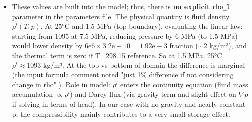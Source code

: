 \documentclass[10pt,a4paper]{article}
\begin{document}
\begin{itemize}
\begin{itemize}
        \item These values are built into the model; thus, there is \textbf{no explicit} \texttt{rho\_l} parameter in the parameters file. The physical quantity is fluid density $\rho^l(T,p)$. At 25°C and 1.5 MPa (top boundary), evaluating the linear law: starting from 1095 at 7.5 MPa, reducing pressure by 6 MPa (to 1.5 MPa) would lower density by $6\text{e}6 \times 3.2\text{e}-10 = 1.92\text{e}-3$ fraction ($\sim$2 kg/m³), and the thermal term is zero if T=298.15 reference. So at 1.5 MPa, 25°C, $\rho^l \approx 1093$ kg/m³. At the top vs bottom of domain the difference is marginal (the input formula comment noted "just 1\% difference if not considering change in rho" \cite{file:03_parameters_TRM}). Role in model: $\rho^l$ enters the continuity equation (fluid mass accumulation $\propto \rho^l$) and Darcy flux (via gravity term and slight effect on $\nabla p$ if solving in terms of head). In our case with no gravity and nearly constant p, the compressibility mainly contributes to a very small storage effect.
    \end{itemize}


\end{itemize}
\end{document}
